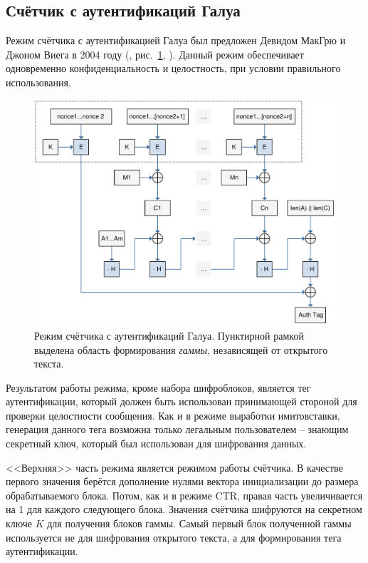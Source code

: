 \subsection{Счётчик с аутентификаций Галуа}

Режим счётчика с аутентификацией Галуа был предложен Девидом МакГрю и Джоном Виега в 2004 году (, рис.~\ref{fig:GCM}, \cite{McGrew:Viega:2004}). Данный режим обеспечивает одновременно конфиденциальность и целостность, при условии правильного использования.

\begin{figure}[bt]
	\centering
	\includegraphics[width=1\textwidth]{pic/GCM}
	\caption{Режим счётчика с аутентификаций Галуа. Пунктирной рамкой выделена область формирования \emph{гаммы}, независящей от открытого текста.}
	\label{fig:GCM}
\end{figure}

Результатом работы режима, кроме набора шифроблоков, является тег аутентификации, который должен быть использован принимающей стороной для проверки целостности сообщения. Как и в режиме выработки имитовставки, генерация данного тега возможна только легальным пользователем -- знающим секретный ключ, который был использован для шифрования данных.

<<Верхняя>> часть режима является режимом работы счётчика. В качестве первого значения берётся дополнение нулями вектора инициализации до размера обрабатываемого блока. Потом, как и в режиме CTR, правая часть увеличивается на 1 для каждого следующего блока. Значения счётчика шифруются на секретном ключе $K$ для получения блоков гаммы. Самый первый блок полученной гаммы используется не для шифрования открытого текста, а для формирования тега аутентификации.

